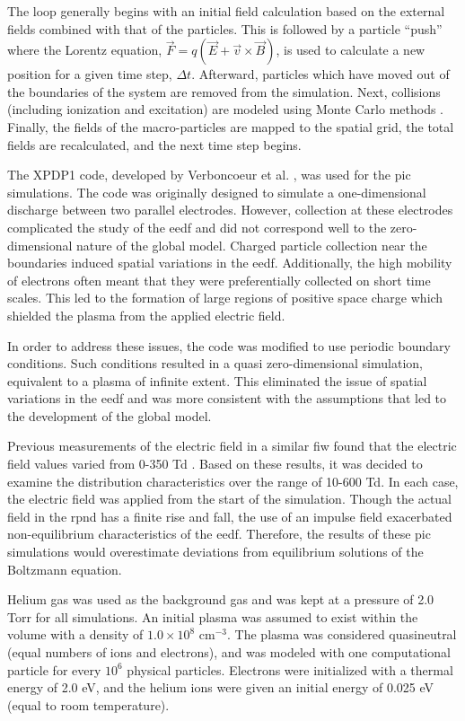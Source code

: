 The loop generally begins with an initial field calculation based on the
external fields combined with that of the particles. This is followed by a
particle ``push'' where the Lorentz equation, $\vec{F} = q(\vec{E} +
\vec{v}\times\vec{B})$, is used to calculate a new position for a given time
step, $\Delta t$. Afterward, particles which have moved out of the boundaries of
the system are removed from the simulation. Next, collisions (including
ionization and excitation) are modeled using Monte Carlo methods
\cite{Birdsall1991}. Finally, the fields of the macro-particles are mapped to
the spatial grid, the total fields are recalculated, and the next time step
begins.

The XPDP1 code, developed by Verboncoeur et al. \cite{Verboncoeur1993}, was used
for the \acs{pic} simulations. The code was originally designed to simulate a
one-dimensional discharge between two parallel electrodes. However, collection
at these electrodes complicated the study of the \acs{eedf} and did not
correspond well to the zero-dimensional nature of the global model. Charged
particle collection near the boundaries induced spatial variations in the
\acs{eedf}. Additionally, the high mobility of electrons often meant that they
were preferentially collected on short time scales. This led to the formation
of large regions of positive space charge which shielded the plasma from the
applied electric field.

In order to address these issues, the code was modified to use periodic boundary
conditions. Such conditions resulted in a quasi zero-dimensional simulation,
equivalent to a plasma of infinite extent. This eliminated the issue of spatial
variations in the \acs{eedf} and was more consistent with the assumptions that
led to the development of the global model.

Previous measurements of the electric field in a similar \acs{fiw} found that
the electric field values varied from 0-350 Td \cite{Takashima2011}. Based on
these results, it was decided to examine the distribution characteristics over
the range of 10-600 Td. In each case, the electric field was applied from the
start of the simulation. Though the actual field in the \acs{rpnd} has a finite
rise and fall, the use of an impulse field exacerbated non-equilibrium
characteristics of the \acs{eedf}. Therefore, the results of these \acs{pic}
simulations would overestimate deviations from equilibrium solutions of the
Boltzmann equation.

Helium gas was used as the background gas and was kept at a pressure of 2.0 Torr
for all simulations. An initial plasma was assumed to exist within the volume
with a density of $1.0\times10^{8}$ cm$^{-3}$. The plasma was considered
quasineutral (equal numbers of ions and electrons), and was modeled with one
computational particle for every $10^6$ physical particles. Electrons were
initialized with a thermal energy of 2.0 eV, and the helium ions were given an
initial energy of 0.025 eV (equal to room temperature).

